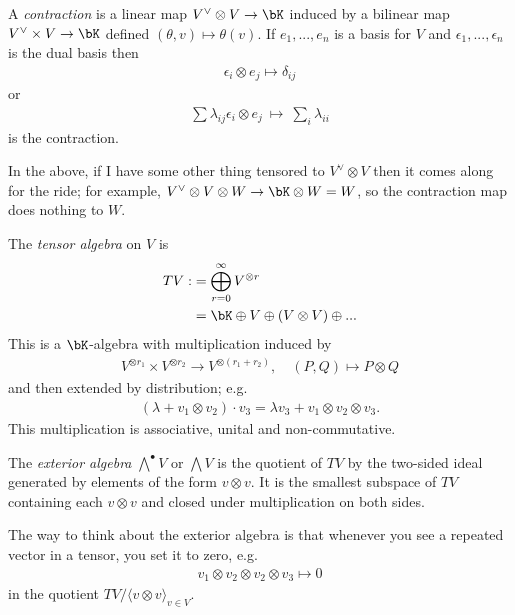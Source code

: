 \begin{defn}\label{defn:contraction}
	A \emph{contraction} is a linear map $V^\vee \otimes V \to \bK$ induced by a bilinear map $V^\vee \times V \to \bK$ defined $(\theta, v) \mapsto \theta(v)$. If $e_1,...,e_n$ is a basis for $V$ and $\epsilon_1,...,\epsilon_n$ is the dual basis then
	\begin{align*}
		\epsilon_i\otimes e_j \mapsto \delta_{ij}
	\end{align*}
	or
	\begin{align*}
		\sum \lambda_{ij}\epsilon_i\otimes e_j ~\mapsto ~ \sum_i \lambda_{ii}
	\end{align*}
	is the contraction.
\end{defn}
In the above, if I have some other thing tensored to $V^\vee\otimes V$ then it comes along for the ride; for example, $V^\vee \otimes V\otimes W \to \bK\otimes W = W$, so the contraction map does nothing to $W$.
\begin{defn}\label{defn:lec2.36}
	The \emph{tensor algebra} on $V$ is
	\begin{align*}
		TV :&= \bigoplus_{r = 0}^\infty V^{\otimes r} \\
		    &= \bK\oplus V \oplus (V\otimes V) \oplus ...
	\end{align*}
	This is a $\bK$-algebra with multiplication induced by
	\begin{align*}
		V^{\otimes r_1}\times V^{\otimes r_2} \to V^{\otimes(r_1+r_2)}, \hspace{1em} (P,Q) \mapsto P \otimes Q
	\end{align*}
	and then extended by distribution; e.g.
	\begin{align*}
		(\lambda + v_1\otimes v_2) \cdot v_3 = \lambda v_3 + v_1\otimes v_2\otimes v_3.
	\end{align*}
	This multiplication is associative, unital and non-commutative.
\end{defn}
\begin{defn}\label{defn:exterior-algebra}
	The \emph{exterior algebra} $\bigwedge^\bullet V$ or $\bigwedge V$ is the quotient of $TV$ by the two-sided ideal generated by elements of the form $v\otimes v$. It is the smallest subspace of $TV$ containing each $v \otimes v$ and closed under multiplication on both sides.
\end{defn}
The way to think about the exterior algebra is that whenever you see a repeated vector in a tensor, you set it to zero, e.g.
\begin{align*}
	v_1\otimes v_2 \otimes v_2\otimes v_3 \mapsto 0
\end{align*}
in the quotient $TV/\langle v\otimes v \rangle_{v \in V}$.

